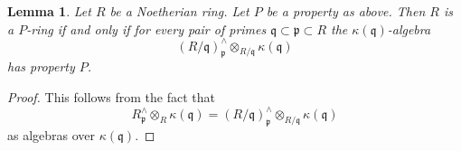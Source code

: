 \documentclass[10pt,a4paper]{amsart}
\theoremstyle{plain}
\newtheorem{lemma}[subsection]{Lemma}
\theoremstyle{definition}
\theoremstyle{remark}
\numberwithin{equation}{subsection}
\begin{document}
\begin{lemma}
\label{lemma-check-P-ring-easy}
Let $R$ be a Noetherian ring. Let $P$ be a property as above.
Then $R$ is a $P$-ring if and only if
for every pair of primes $\mathfrak q \subset \mathfrak p \subset R$
the $\kappa(\mathfrak q)$-algebra
$$
(R/\mathfrak q)_\mathfrak p^\wedge \otimes_{R/\mathfrak q} \kappa(\mathfrak q)
$$
has property $P$.
\end{lemma}

\begin{proof}
This follows from the fact that
$$
R_\mathfrak p^\wedge \otimes_R \kappa(\mathfrak q) =
(R/\mathfrak q)_\mathfrak p^\wedge \otimes_{R/\mathfrak q} \kappa(\mathfrak q)
$$
as algebras over $\kappa(\mathfrak q)$.
\end{proof}
\end{document}
